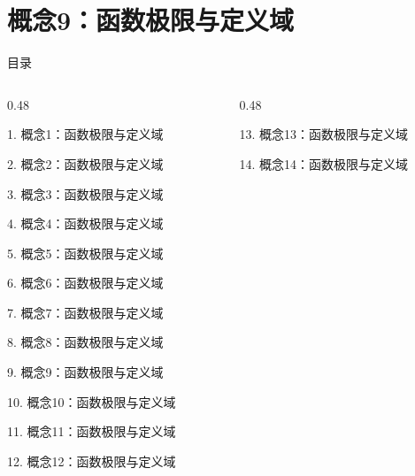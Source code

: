 \documentclass[aspectratio=169,10pt,fontset=fandol]{ctexbeamer}
\begin{document}
\section{概念9：函数极限与定义域}
\begin{frame}[t,fragile]{目录}
\small
\begin{columns}[T,onlytextwidth]
\begin{column}{0.48\textwidth}
{\color{black}\small 1. 概念1：函数极限与定义域\par}\vspace{0.22em}
{\color{black}\small 2. 概念2：函数极限与定义域\par}\vspace{0.22em}
{\color{black}\small 3. 概念3：函数极限与定义域\par}\vspace{0.22em}
{\color{black}\small 4. 概念4：函数极限与定义域\par}\vspace{0.22em}
{\color{black}\small 5. 概念5：函数极限与定义域\par}\vspace{0.22em}
{\color{black}\small 6. 概念6：函数极限与定义域\par}\vspace{0.22em}
{\color{black}\small 7. 概念7：函数极限与定义域\par}\vspace{0.22em}
{\color{black}\small 8. 概念8：函数极限与定义域\par}\vspace{0.22em}
{\color{blue}\small 9. 概念9：函数极限与定义域\par}\vspace{0.22em}
{\color{gray!40}\small 10. 概念10：函数极限与定义域\par}\vspace{0.22em}
{\color{gray!40}\small 11. 概念11：函数极限与定义域\par}\vspace{0.22em}
{\color{gray!40}\small 12. 概念12：函数极限与定义域\par}\vspace{0.22em}
\end{column}
\begin{column}{0.48\textwidth}
{\color{gray!40}\small 13. 概念13：函数极限与定义域\par}\vspace{0.22em}
{\color{gray!40}\small 14. 概念14：函数极限与定义域\par}\vspace{0.22em}

\end{column}
\end{columns}
\end{frame}
\end{document}
